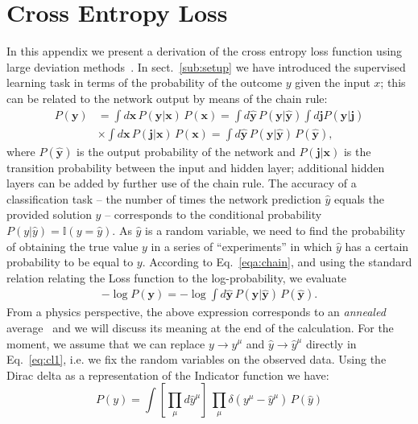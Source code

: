\documentclass{article}
\begin{document}
\section{Cross Entropy Loss} \label{a:loss}
%
In this appendix we present a derivation of the cross entropy loss function using large deviation methods~\cite{mezard}. In sect.~\eqref{sub:setup} we have introduced the supervised learning task in terms of the probability of the outcome $y$ given the input $x$; this can be related to the network output by means of the chain rule:
%
\begin{align} \nonumber
P(\mathbf{y}) &= \int d\mathbf{x} \, P(\mathbf{y} | \mathbf{x}) \, P(\mathbf{x}) = \int d \hat{\mathbf{y}} \, P(\mathbf{y} | \hat{\mathbf{y}} ) \int d\mathbf{j}  P(\hat{\mathbf{y}}|\mathbf{j}) \\
&\times \int d\mathbf{x} \, P(\mathbf{j} | \mathbf{x}) \, P(\mathbf{x})
= \int d \hat{\mathbf{y}} \, P(\mathbf{y} | \hat{\mathbf{y}} ) \, P(\hat{\mathbf{y}}),
\label{eqa:chain}
\end{align}
%
where $P(\hat{\mathbf{y}})$ is the output probability of the network and $ P(\mathbf{j} | \mathbf{x})$ is the transition probability between the input and hidden layer; additional hidden layers can be added by further use of the chain rule. The accuracy of a classification task -- the number of times the network prediction $\hat{y}$ equals the provided solution $y$ -- corresponds to the conditional probability $P(y|\hat{y}) =  \mathbb{I}(y = \hat{y})$. As $\hat{y}$ is a random variable, we need to find the probability of obtaining the true value $y$ in a series of ``experiments'' in which $\hat{y}$  has a certain probability to be equal to $y$. According to Eq.~\eqref{eqa:chain}, and using the standard relation relating the Loss function to the log-probability, we evaluate
%
 \begin{align} \label{eq:cl1}
-\log P(\mathbf{y}) = - \log \int d \hat{\mathbf{y}}\, P(\mathbf{y} | \hat{\mathbf{y}}) \, P(\hat{\mathbf{y}}).
 \end{align}
%
From a physics perspective, the above expression corresponds to an {\it annealed } average~\cite{parisi2, giardina} and we will discuss its meaning at the end of the calculation. For the moment, we assume that we can replace $y \to y^{\mu}$ and $\hat{y} \to \hat{y}^{\mu}$ directly in Eq.~\eqref{eq:cl1}, i.e. we fix the random variables on the observed data. Using the Dirac delta  as a representation of the Indicator function we have:
%
 \begin{equation}  \nonumber
 P(y) =  \int  \left[ \prod_{\mu} d \hat{y}^{\mu} \right]  \,  \prod_{\mu} \delta( y^{\mu} - \hat{y}^{\mu})  \, P(\hat{y})
\label{eqa:cl1}
 \end{equation}
\end{document}
